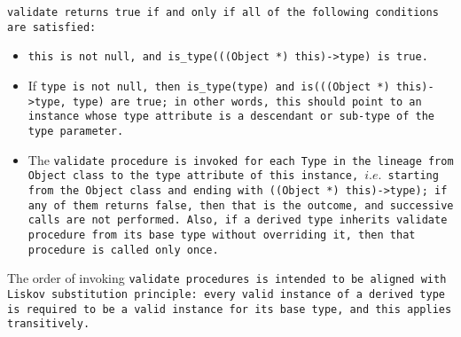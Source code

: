 \tt{validate} returns \tt{true} if and only if
all of the following conditions are satisfied:

\begin{itemize}

\item \tt{this} is not null, and
\tt{is_type(((Object *) this)->type)} is \tt{true}.

\item If \tt{type} is not null, then \tt{is_type(type)}
and \tt{is(((Object *) this)->type, type)} are \tt{true};
in other words, \tt{this} should point to an instance whose \tt{type}
attribute is a descendant or sub-type of the \tt{type} parameter.

\item The \tt{validate} procedure is invoked for each \tt{Type} in the
lineage from \tt{Object} class to the \tt{type} attribute of \tt{this}
instance, $i.e.$ starting from the \tt{Object} class and ending with
\tt{((Object *) this)->type)}; if any of them returns \tt{false},
then that is the outcome, and successive calls are not performed.
Also, if a derived type inherits \tt{validate} procedure from its base
type without overriding it, then that procedure is called only once.

\end{itemize}

\note The order of invoking \tt{validate} procedures is intended to be aligned
with Liskov substitution principle: every valid instance of a derived type is
required to be a valid instance for its base type, and this applies transitively.
